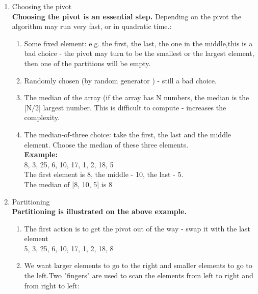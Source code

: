\documentclass{article}
\begin{document}
	\begin{enumerate}
		\item Choosing the pivot \\ \textbf{ Choosing the pivot is an essential step.} Depending on the pivot the algorithm may run very fast, or in quadratic time.:
		\begin{enumerate}
			\item  Some fixed element: e.g. the first, the last, the one in the middle,this is a bad choice - the pivot may turn to be the smallest or the largest element, then one of the partitions will be empty.
			\item Randomly chosen (by random generator ) - still a bad choice. 
			\item The median of the array (if the array has N numbers, the median is the [N/2] largest number. This is difficult to compute - increases the complexity. 
			\item The median-of-three choice: take the first, the last and the middle element. Choose the median of these three elements. \\
			
			\textbf{Example:}\\
			8, 3, 25, 6, 10, 17, 1, 2, 18, 5 \\
			The first element is 8, the middle - 10, the last - 5. \\
			The median of [8, 10, 5] is 8
		\end{enumerate}
		
		\item Partitioning \\ \textbf{Partitioning is illustrated on the above example.}
		\begin{enumerate}
			\item The first action is to get the pivot out of the way - swap it with the last element \\
			5, 3, 25, 6, 10, 17, 1, 2, 18, 8\\
			\item  We want larger elements to go to the right and smaller elements to go to the left.Two "fingers" are used to scan the elements from left to right and from right to left:\\
			

\end{enumerate}
\end{enumerate}
\end{document}
